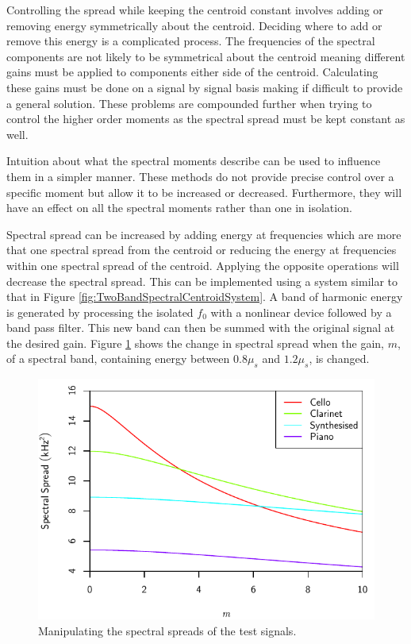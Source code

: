 			Controlling the spread while keeping the centroid constant involves adding or removing energy
			symmetrically about the centroid. Deciding where to add or remove this energy is a complicated
			process. The frequencies of the spectral components are not likely to be symmetrical about the
			centroid meaning different gains must be applied to components either side of the centroid.
			Calculating these gains must be done on a signal by signal basis making if difficult to provide a
			general solution. These problems are compounded further when trying to control the higher order
			moments as the spectral spread must be kept constant as well.

			Intuition about what the spectral moments describe can be used to influence them in a simpler
			manner. These methods do not provide precise control over a specific moment but allow it to be
			increased or decreased.  Furthermore, they will have an effect on all the spectral moments rather
			than one in isolation. 
			
			Spectral spread can be increased by adding energy at frequencies which are more that one spectral
			spread from the centroid or reducing the energy at frequencies within one spectral spread of the
			centroid.  Applying the opposite operations will decrease the spectral spread. This can be
			implemented using a system similar to that in Figure \ref{fig:TwoBandSpectralCentroidSystem}. A
			band of harmonic energy is generated by processing the isolated $f_{0}$ with a nonlinear device
			followed by a band pass filter. This new band can then be summed with the original signal at the
			desired gain. Figure \ref{fig:MoveSpreads} shows the change in spectral spread when the gain, $m$,
			of a spectral band, containing energy between $0.8\mu_{s}$ and $1.2\mu_{s}$, is changed.

			\begin{figure}[h!]
				\centering
				\includegraphics{chapter6/Images/MoveSpreads.pdf}
				\caption{Manipulating the spectral spreads of the test signals.}
				\label{fig:MoveSpreads}
			\end{figure}

